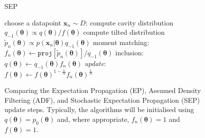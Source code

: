 \begin{figure}[!t]
\begin{minipage}[t]{0.33\linewidth}
\begin{algorithm}[H]
\begin{algorithmic}[1]
\end{algorithmic}
\end{algorithm}
\end{minipage}
\begin{minipage}[t]{0.33\linewidth}
\centering
\begin{algorithm}[H]
\caption{SEP} \small
\label{alg:sep} 
\begin{algorithmic}[1] 
	\STATE choose a datapoint $\bm{x}_n\sim D$:
	\STATE compute cavity distribution \\ $q_{-1}(\bm{\theta}) \propto q(\bm{\theta}) / f(\bm{\theta})$
	\STATE compute tilted distribution \\$\tilde{p}_n(\bm{\theta}) \propto p(\bm{x}_n|\bm{\theta}) q_{-1}(\bm{\theta})$
	\STATE moment matching: \\\hspace{-1mm}$f_n(\bm{\theta}) \leftarrow \mathtt{proj}[\tilde{p}_n(\bm{\theta})] / q_{-1}(\bm{\theta}) $
	\STATE inclusion:\\ $q(\bm{\theta}) \leftarrow q_{-1}(\bm{\theta}) f_n(\bm{\theta})$
	\STATE \textit{update}:\\ $f(\bm{\theta}) \leftarrow f(\bm{\theta})^{1 - \frac{1}{N}} f_n(\bm{\theta})^{\frac{1}{N}}$
\end{algorithmic}
\end{algorithm}
\end{minipage} 
%
\caption{Comparing the Expectation Propagation (EP), Assumed Density Filtering (ADF), and Stochastic Expectation Propagation (SEP) update steps. Typically, the algorithms will be initialised using $q(\mathbf{\theta}) = p_0(\mathbf{\theta})$ and, where appropriate, $f_n(\mathbf{\theta})=1$ and $f(\mathbf{\theta})=1$.}
\end{figure}

%
%
